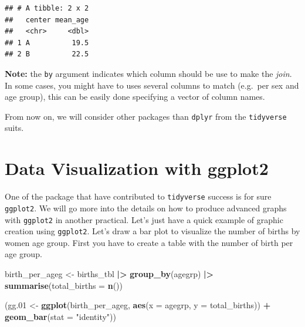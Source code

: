\documentclass[
]{book}
\newenvironment{Shaded}{\begin{snugshade}}{\end{snugshade}}
\newcommand{\AttributeTok}[1]{\textcolor[rgb]{0.13,0.29,0.53}{#1}}
\newcommand{\FloatTok}[1]{\textcolor[rgb]{0.00,0.00,0.81}{#1}}
\newcommand{\FunctionTok}[1]{\textcolor[rgb]{0.13,0.29,0.53}{\textbf{#1}}}
\newcommand{\NormalTok}[1]{#1}
\newcommand{\OtherTok}[1]{\textcolor[rgb]{0.56,0.35,0.01}{#1}}
\newcommand{\SpecialCharTok}[1]{\textcolor[rgb]{0.81,0.36,0.00}{\textbf{#1}}}
\newcommand{\StringTok}[1]{\textcolor[rgb]{0.31,0.60,0.02}{#1}}
\begin{document}
\begin{verbatim}
## # A tibble: 2 x 2
##   center mean_age
##   <chr>     <dbl>
## 1 A          19.5
## 2 B          22.5
\end{verbatim}

\textbf{Note:} the \texttt{by} argument indicates which column should be use to make the \emph{join}. In some
cases, you might have to uses several columns to match (e.g.~per sex and age group), this
can be easily done specifying a vector of column names.

From now on, we will consider other packages than \texttt{dplyr} from the \texttt{tidyverse} suits.

\section{Data Visualization with ggplot2}\label{data-visualization-with-ggplot2}

One of the package that have contributed to \texttt{tidyverse} success is for sure \texttt{ggplot2}.
We will go more into the details on how to produce advanced graphs with \texttt{ggplot2} in another practical.
Let's just have a quick example of graphic creation using \texttt{ggplot2}.
Let's draw a bar plot to visualize the number of births by women age group.
First you have to create a table with the number of birth per age group.

\begin{Shaded}
\begin{Highlighting}[]
\NormalTok{birth\_per\_ageg }\OtherTok{\textless{}{-}}\NormalTok{ births\_tbl }\SpecialCharTok{|\textgreater{}}
  \FunctionTok{group\_by}\NormalTok{(agegrp) }\SpecialCharTok{|\textgreater{}}
  \FunctionTok{summarise}\NormalTok{(}\AttributeTok{total\_births =} \FunctionTok{n}\NormalTok{())}
\end{Highlighting}
\end{Shaded}

\begin{Shaded}
\begin{Highlighting}[]
\NormalTok{(gg}\FloatTok{.01} \OtherTok{\textless{}{-}}
  \FunctionTok{ggplot}\NormalTok{(birth\_per\_ageg, }\FunctionTok{aes}\NormalTok{(}\AttributeTok{x =}\NormalTok{ agegrp, }\AttributeTok{y =}\NormalTok{ total\_births)) }\SpecialCharTok{+}
  \FunctionTok{geom\_bar}\NormalTok{(}\AttributeTok{stat =} \StringTok{"identity"}\NormalTok{))}
\end{Highlighting}
\end{Shaded}
\end{document}
